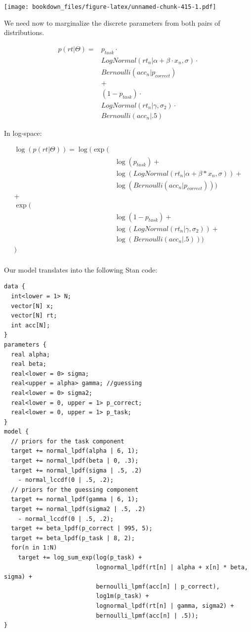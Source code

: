 \documentclass[12pt,]{krantz}
\theoremstyle{definition}
\theoremstyle{definition}
\theoremstyle{definition}
\theoremstyle{remark}
\begin{document}
\texttt{[image: bookdown\_files/figure-latex/unnamed-chunk-415-1.pdf]}

We need now to marginalize the discrete parameters from both pairs of distributions.

\begin{equation}
\begin{aligned}
p(rt | \Theta) = & p_{task} \cdot \\
& LogNormal(rt_n | \alpha + \beta \cdot x_n, \sigma) \cdot \\
& Bernoulli(acc_n | p_{correct}) \\
& +\\ 
& (1 - p_{task}) \cdot \\
& LogNormal(rt_n | \gamma, \sigma_2) \cdot\\
& Bernoulli(acc_n | .5)
\end{aligned}
\end{equation}

In log-space:

\begin{equation}
\begin{aligned}
\log(p(rt | \Theta)) =  \log(\exp(&\\
& \log(p_{task}) +\\
  &\log(LogNormal(rt_n | \alpha + \beta * x_n, \sigma)) + \\
  &\log(Bernoulli(acc_n | p_{correct})))\\
  +&\\ 
 \exp(&\\
 & \log(1 - p_{task}) + \\
 & \log(LogNormal(rt_n |\gamma, \sigma_2)) + \\
 & \log(Bernoulli(acc_n | .5)))\\
    )& \\
\end{aligned}
\end{equation}

Our model translates into the following Stan code:

\begin{verbatim}
data {
  int<lower = 1> N;
  vector[N] x;
  vector[N] rt;
  int acc[N];
}
parameters {
  real alpha;
  real beta;
  real<lower = 0> sigma;
  real<upper = alpha> gamma; //guessing
  real<lower = 0> sigma2;
  real<lower = 0, upper = 1> p_correct;
  real<lower = 0, upper = 1> p_task;
}
model {
  // priors for the task component
  target += normal_lpdf(alpha | 6, 1);
  target += normal_lpdf(beta | 0, .3);
  target += normal_lpdf(sigma | .5, .2)
    - normal_lccdf(0 | .5, .2);
  // priors for the guessing component
  target += normal_lpdf(gamma | 6, 1);
  target += normal_lpdf(sigma2 | .5, .2)
    - normal_lccdf(0 | .5, .2);
  target += beta_lpdf(p_correct | 995, 5);
  target += beta_lpdf(p_task | 8, 2);
  for(n in 1:N)
    target += log_sum_exp(log(p_task) +
                          lognormal_lpdf(rt[n] | alpha + x[n] * beta, sigma) +
                          bernoulli_lpmf(acc[n] | p_correct),
                          log1m(p_task) +
                          lognormal_lpdf(rt[n] | gamma, sigma2) +
                          bernoulli_lpmf(acc[n] | .5));
}
\end{verbatim}
\end{document}
